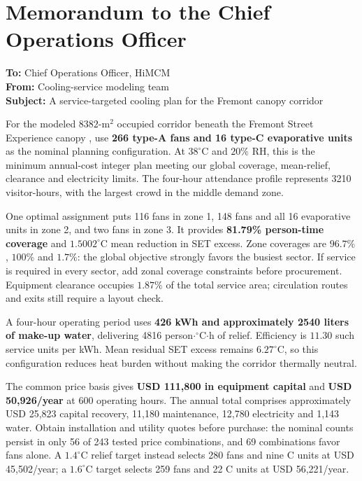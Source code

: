 \clearpage
\section*{Memorandum to the Chief Operations Officer}
\noindent\textbf{To:} Chief Operations Officer, HiMCM\\
\textbf{From:} Cooling-service modeling team\\
\textbf{Subject:} A service-targeted cooling plan for the Fremont canopy corridor

For the modeled $8382$-m$^2$ occupied corridor beneath the Fremont Street Experience canopy \cite{fremont-canopy}, use \textbf{266 type-A fans and 16 type-C evaporative units} as the nominal planning configuration. At $38^\circ$C and $20\%$ RH, this is the minimum annual-cost integer plan meeting our global coverage, mean-relief, clearance and electricity limits. The four-hour attendance profile represents 3210 visitor-hours, with the largest crowd in the middle demand zone.

One optimal assignment puts 116 fans in zone 1, 148 fans and all 16 evaporative units in zone 2, and two fans in zone 3. It provides \textbf{81.79\% person-time coverage} and $1.5002^\circ$C mean reduction in SET excess. Zone coverages are $96.7\%$, $100\%$ and $1.7\%$: the global objective strongly favors the busiest sector. If service is required in every sector, add zonal coverage constraints before procurement. Equipment clearance occupies $1.87\%$ of the total service area; circulation routes and exits still require a layout check.

A four-hour operating period uses \textbf{426 kWh and approximately 2540 liters of make-up water}, delivering 4816 person$\cdot{}^\circ$C$\cdot$h of relief. Efficiency is $11.30$ such service units per kWh. Mean residual SET excess remains $6.27^\circ$C, so this configuration reduces heat burden without making the corridor thermally neutral.

The common price basis gives \textbf{USD 111,800 in equipment capital} and \textbf{USD 50,926/year} at 600 operating hours. The annual total comprises approximately USD 25,823 capital recovery, 11,180 maintenance, 12,780 electricity and 1,143 water. Obtain installation and utility quotes before purchase: the nominal counts persist in only 56 of 243 tested price combinations, and 69 combinations favor fans alone. A $1.4^\circ$C relief target instead selects 280 fans and nine C units at USD 45,502/year; a $1.6^\circ$C target selects 259 fans and 22 C units at USD 56,221/year.


